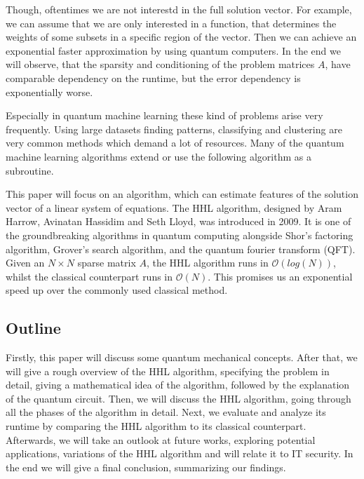 Though, oftentimes we are not interestd in the full solution vector. 
For example, we can assume that we are only interested in a function, that determines the weights of some subsets in a specific region of the vector.
Then we can achieve an exponential faster approximation by using quantum computers. 
In the end we will observe, that the sparsity and conditioning of the problem matrices $A$, have comparable dependency on the runtime, but the error dependency is exponentially worse. 

Especially in quantum machine learning these kind of problems arise very frequently. 
Using large datasets finding patterns, classifying and clustering are very common methods which demand a lot of resources. 
Many of the quantum machine learning algorithms extend or use the following algorithm as a subroutine. 

This paper will focus on an algorithm, which can estimate features of the solution vector of a linear system of equations.
The HHL algorithm, designed by Aram Harrow, Avinatan Hassidim and Seth Lloyd, was introduced in 2009. 
It is one of the groundbreaking algorithms in quantum computing alongside Shor's factoring algorithm, Grover's search algorithm, and the quantum fourier transform (QFT).
Given an $N \times N$ sparse matrix $A$, the HHL algorithm runs in $\mathcal{O} (log (N))$, whilst the classical counterpart runs in $\mathcal{O} (N)$.
This promises us an exponential speed up over the commonly used classical method.

\subsection{Outline}
Firstly, this paper will discuss some quantum mechanical concepts.
After that, we will give a rough overview of the HHL algorithm, specifying the problem in detail, giving a mathematical idea of the algorithm, followed by the explanation of the quantum circuit.
Then, we will discuss the HHL algorithm, going through all the phases of the algorithm in detail. 
Next, we evaluate and analyze its runtime by comparing the HHL algorithm to its classical counterpart. 
Afterwards, we will take an outlook at future works, exploring potential applications, variations of the HHL algorithm and will relate it to IT security. 
In the end we will give a final conclusion, summarizing our findings. 





